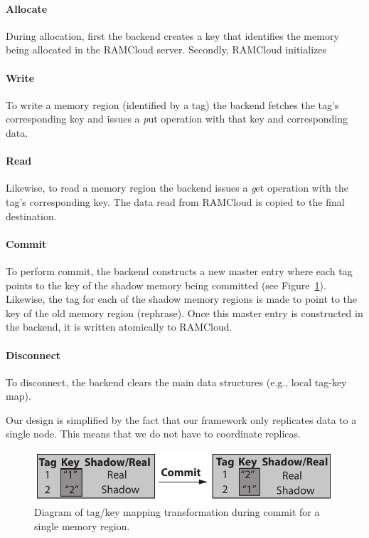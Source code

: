 \paragraph{\bf Allocate} During allocation, first the backend creates a key that identifies the memory being allocated in the RAMCloud server. Secondly, RAMCloud initializes
\paragraph{\bf Write} To write a memory region (identified by a tag) the backend fetches the tag's corresponding key and issues a {\emph put } operation with that key and corresponding data.
\paragraph{\bf Read} Likewise, to read a memory region the backend issues a {\emph get} operation with the tag's corresponding key. The data read from RAMCloud is copied to the final destination.
\paragraph{\bf Commit} To perform commit, the backend constructs a new master entry where each tag points to the key of the shadow memory being committed (see Figure~\ref{fig:ramcloud_backend_commit}). Likewise, the tag for each of the shadow
memory regions is made to point to the key of the old memory region (rephrase). Once this master entry is constructed in the backend, it is written atomically to RAMCloud.
\paragraph{\bf Disconnect} To disconnect, the backend clears the main data structures (e.g., local tag-key map).

Our design is simplified by the fact that our framework only replicates data to a single node. This means that we do not have to coordinate replicas.

\begin{figure}[t!]
\begin{center}
\includegraphics[scale=0.60]{graphs/ramcloud_backend_commit.pdf}
\end{center}
\caption{Diagram of tag/key mapping transformation during commit for a single memory region.}
\label{fig:ramcloud_backend_commit}
\end{figure}
